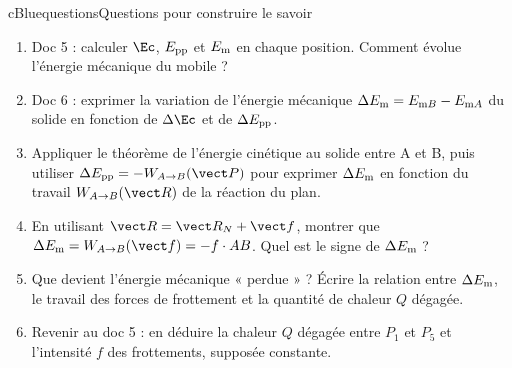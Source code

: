 \begin{rub}{cBlue}{questions}{Questions pour construire le savoir}
\begin{enumerate}
  \item {} Doc 5 : calculer $\Ec$, $E_{\mathrm{pp}}$ et $E_{\mathrm{m}}$ en chaque position. Comment évolue l’énergie mécanique du mobile ?
  \item {} Doc 6 : exprimer la variation de l’énergie mécanique $\Delta E_{\mathrm{m}} = E_{\mathrm{m}B} - E_{\mathrm{m}A}$ du solide en fonction de $\Delta\Ec$ et de $\Delta E_{\mathrm{pp}}$.
  \item {} Appliquer le théorème de l’énergie cinétique au solide entre A et B, puis utiliser $\Delta\Epp = -\WAB P$ pour exprimer $\Delta E_{\mathrm{m}}$ en fonction du travail $\WAB R$ de la réaction du plan.
  \item {} En utilisant $\vect R = \vect R_N + \vect f$, montrer que $\Delta\Em = \WAB f = -f\cdot AB$. Quel est le signe de $\Delta E_{\mathrm{m}}$ ?
  \item {} Que devient l’énergie mécanique « perdue » ? Écrire la relation entre $\Delta E_{\mathrm{m}}$, le travail des forces de frottement et la quantité de chaleur $Q$ dégagée.
  \item {} Revenir au doc 5 : en déduire la chaleur $Q$ dégagée entre $P_1$ et $P_5$ et l’intensité $f$ des frottements, supposée constante.
\end{enumerate}
\end{rub}


